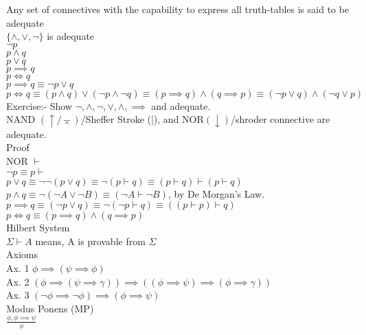 \documentclass[12pt,oneside,notitlepage]{book}
\theoremstyle{definition}
\begin{document}
Any set of connectives with the capability to express all truth-tables is said to be adequate \\
$\{ \land , \lor , \neg \}$ is adequate \\
$\neg p$ \\
$p \land q$ \\
$p \lor q$ \\
$p \implies q$ \\
$p \iff q$ \\
$p \implies q \equiv \neg p \lor q$ \\
$p \iff q \equiv (p \land q) \lor (\neg p \land \neg q) \equiv (p  \implies q) \land (q \implies p) \equiv (\neg p \lor q) \land (\neg q \lor p)$ \\

Exercise:- Show ${\neg, \land}, {\neg, \lor}, {\land, \implies}$ and adequate. \\ 
NAND $(\uparrow / \barwedge)$/Sheffer Stroke (|), and NOR$(\downarrow )$/shroder connective are adequate. \\

Proof \\
NOR $\vdash$ \\
$\neg p \equiv p \vdash$ \\
$p \lor q \equiv \neg \neg (p \lor q) \equiv \neg (p \vdash q) \equiv (p \vdash q) \vdash (p \vdash q)$ \\
$p \land q \equiv \neg (\neg A \lor \neg B) \equiv (\neg A \vdash \neg B)$, by De Morgan's Law. \\
$p \implies q \equiv (\neg p \lor q) \equiv \neg (\neg p \vdash q) \equiv ((p \vdash p) \vdash q)$ \\
$p \iff q \equiv (p \implies q) \land (q \implies p)$ \\

Hilbert System \\
$\Sigma \vdash A$ means, A is provable from $\Sigma$ \\
Axioms \\
Ax. 1 $\phi \implies (\psi \implies \phi)$ \\
Ax. 2 $(\phi \implies (\psi \implies \gamma)) \implies ((\phi \implies \psi) \implies (\phi \implies \gamma))$ \\
Ax. 3 $(\neg \phi \implies \neg \phi) \implies (\phi \implies \psi)$ \\

Modus Ponens (MP) \\
$\frac{\phi,\phi \implies \psi}{\phi}$ \\
\end{document}
